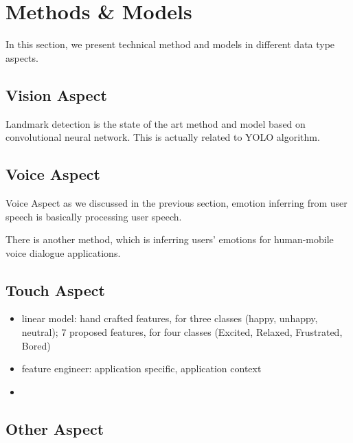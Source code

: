 \section{Methods \& Models}
\label{sec:models}

In this section, we present technical method and models in different data type aspects.

\subsection{Vision Aspect} 
\label{subsec:vision-model}

Landmark detection is the state of the art method and model based on convolutional neural network.
This is actually related to YOLO algorithm.

\subsection{Voice Aspect}
\label{subsec:voice-model}

Voice Aspect as we discussed in the previous section, emotion inferring from user speech is basically
processing user speech.

There is another method, which is inferring users' emotions for human-mobile voice dialogue applications.

\subsection{Touch Aspect}
\label{subsec:touch-model}

\begin{itemize}
  \item linear model: 
      \cite{Shah2015} hand crafted features, for three classes (happy, unhappy, neutral); 
      \cite{bhattacharya2017predictive} 7 proposed features, for four classes (Excited, Relaxed, Frustrated, Bored)

  \item feature engineer: \cite{Gao2012} application specific, application context
  \item 
\end{itemize}


\subsection{Other Aspect}
\label{subsec:other-model}